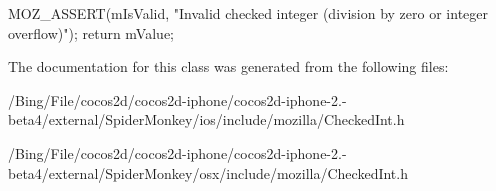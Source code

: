 \begin{DoxyCode}
    {
      MOZ_ASSERT(mIsValid, "Invalid checked integer (division by zero or
       integer overflow)");
      return mValue;
    }
\end{DoxyCode}


The documentation for this class was generated from the following files\-:\begin{DoxyCompactItemize}
\item 
/\-Bing/\-File/cocos2d/cocos2d-\/iphone/cocos2d-\/iphone-\/2.-\/beta4/external/\-Spider\-Monkey/ios/include/mozilla/Checked\-Int.\-h\item 
/\-Bing/\-File/cocos2d/cocos2d-\/iphone/cocos2d-\/iphone-\/2.-\/beta4/external/\-Spider\-Monkey/osx/include/mozilla/Checked\-Int.\-h\end{DoxyCompactItemize}

